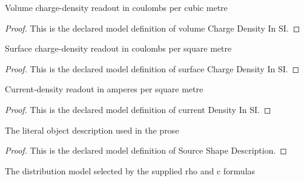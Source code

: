 \begin{definition}
  \label{def:physics:phyx-mini-0627:phyxminiproblems-problemphyxmini0627-volumechargedensityinsi}
  Volume charge-density readout in coulombs per cubic metre
\end{definition}
\begin{proof}
  This is the declared model definition of volume Charge Density In SI.
\end{proof}
\begin{definition}
  \label{def:physics:phyx-mini-0627:phyxminiproblems-problemphyxmini0627-surfacechargedensityinsi}
  Surface charge-density readout in coulombs per square metre
\end{definition}
\begin{proof}
  This is the declared model definition of surface Charge Density In SI.
\end{proof}
\begin{definition}
  \label{def:physics:phyx-mini-0627:phyxminiproblems-problemphyxmini0627-currentdensityinsi}
  Current-density readout in amperes per square metre
\end{definition}
\begin{proof}
  This is the declared model definition of current Density In SI.
\end{proof}
\begin{definition}
  \label{def:physics:phyx-mini-0627:phyxminiproblems-problemphyxmini0627-sourceshapedescription}
  The literal object description used in the prose
\end{definition}
\begin{proof}
  This is the declared model definition of Source Shape Description.
\end{proof}
\begin{definition}
  \label{def:physics:phyx-mini-0627:phyxminiproblems-problemphyxmini0627-effectivedistributionmodel}
  The distribution model selected by the supplied rho and c formulas
\end{definition}
